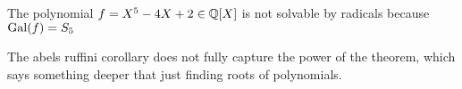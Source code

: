 \begin{cor}[]
  The polynomial $f = X^{5} - 4X + 2 \in \mathbb{Q}[X]$ is not solvable by radicals because $\operatorname{Gal}(f) = S_5$
\end{cor}

The abels ruffini corollary does not fully capture the power of the theorem, which says something deeper that just finding roots of polynomials.




